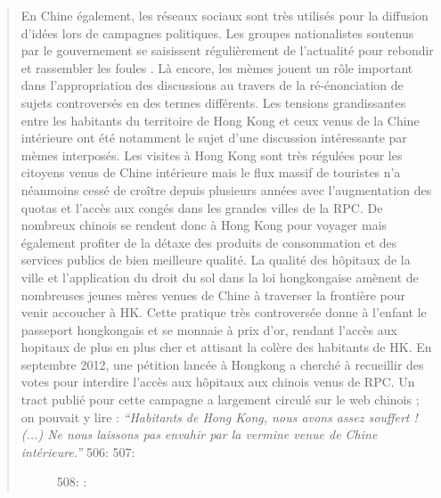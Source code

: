 \begin{quote}
\begin{description}
En Chine \'egalement, les r\'eseaux sociaux sont tr\`es utilis\'es pour la diffusion d{\textquoteright}id\'ees lors de campagnes politiques. Les groupes nationalistes soutenus par le gouvernement se saisissent r\'eguli\`erement de l{\textquoteright}actualit\'e pour rebondir et rassembler les foules \cite{Wu2007}. L\`a encore, les m\`emes jouent un r\^ole important dans l{\textquoteright}appropriation des discussions au travers de la r\'e-\'enonciation de sujets controvers\'es en des termes diff\'erents. Les tensions grandissantes entre les habitants du territoire de Hong Kong et ceux venus de la Chine int\'erieure ont \'et\'e notamment le sujet d{\textquoteright}une discussion int\'eressante par m\`emes interpos\'es. Les visites \`a Hong Kong sont tr\`es r\'egul\'ees pour les citoyens venus de Chine int\'erieure mais le flux massif de touristes n{\textquoteright}a n\'eanmoins cess\'e de cro\^itre depuis plusieurs ann\'ees avec l{\textquoteright}augmentation des quotas et l{\textquoteright}acc\`es aux cong\'es dans les grandes villes de la RPC. De nombreux chinois se rendent donc \`a Hong Kong pour voyager mais \'egalement profiter de la d\'etaxe des produits de consommation et des services publics de bien meilleure qualit\'e. La qualit\'e des h\^opitaux de la ville et l{\textquoteright}application du droit du sol dans la loi hongkongaise am\`enent de nombreuses jeunes m\`eres venues de Chine \`a traverser la fronti\`ere pour venir accoucher \`a HK. Cette pratique tr\`es controvers\'ee donne \`a l{\textquoteright}enfant le passeport hongkongais et se monnaie \`a prix d{\textquoteright}or, rendant l{\textquoteright}acc\`es aux hopitaux de plus en plus cher et attisant la col\`ere des habitants de HK. En septembre 2012, une p\'etition lanc\'ee \`a Hongkong a cherch\'e \`a recueillir des votes pour interdire l{\textquoteright}acc\`es aux h\^opitaux aux chinois venus de RPC. Un tract publi\'e pour cette campagne a largement circul\'e sur le web chinois ; on pouvait y lire :\textit{ {\textquotedblleft}Habitants de Hong Kong, nous avons assez souffert ! (...) Ne nous laissons pas envahir par la vermine venue de Chine int\'erieure.{\textquotedblright}}  
506: 
507: \begin{figure}
508:     :     
\end{figure}
\end{description}
\end{quote}
